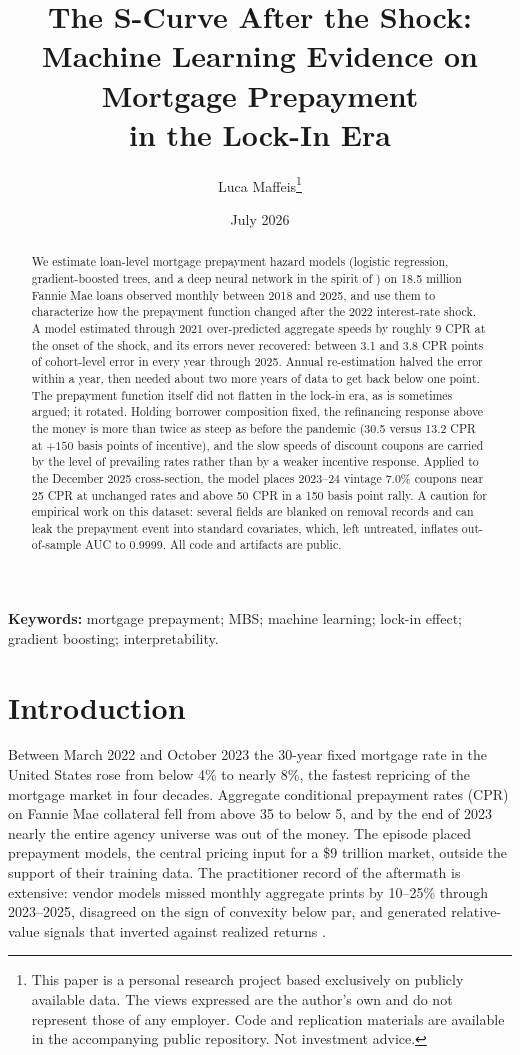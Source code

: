 \documentclass[11pt]{article}
\title{\textbf{The S-Curve After the Shock:\\ Machine Learning Evidence on Mortgage Prepayment\\ in the Lock-In Era}}
\author{Luca Maffeis\thanks{This paper is a personal research project based exclusively on publicly
available data. The views expressed are the author's own and do not represent those of any employer.
Code and replication materials are available in the accompanying public repository. Not investment advice.}}
\date{July 2026}
\begin{document}
\maketitle

\begin{abstract}
\noindent
We estimate loan-level mortgage prepayment hazard models (logistic regression, gradient-boosted
trees, and a deep neural network in the spirit of \citet{sadhwani2021deep}) on 18.5 million Fannie
Mae loans observed monthly between 2018 and 2025, and use them to characterize how the prepayment
function changed after the 2022 interest-rate shock. A model estimated through 2021
over-predicted aggregate speeds by roughly 9 CPR at the onset of the shock, and its errors never
recovered: between 3.1 and 3.8 CPR points of cohort-level error in every year through 2025.
Annual re-estimation halved the error within a year, then needed about two more years of data to
get back below one point. The prepayment function itself did not flatten in the lock-in era, as
is sometimes argued; it rotated. Holding borrower composition fixed, the refinancing response
above the money is more than twice as steep as before the pandemic (30.5 versus 13.2 CPR at
$+150$ basis points of incentive), and the slow speeds of discount coupons are carried by the
level of prevailing rates rather than by a weaker incentive response. Applied to the December
2025 cross-section, the model places 2023--24 vintage 7.0\% coupons near 25 CPR at unchanged
rates and above 50 CPR in a 150 basis point rally. A caution for empirical work on this dataset:
several fields are blanked on removal records and can leak the prepayment event into standard
covariates, which, left untreated, inflates out-of-sample AUC to 0.9999. All code and artifacts are
public.
\end{abstract}

\vspace{0.5em}
\noindent\textbf{Keywords:} mortgage prepayment; MBS; machine learning; lock-in effect;
gradient boosting; interpretability.

\section{Introduction}
\label{sec:intro}

Between March 2022 and October 2023 the 30-year fixed mortgage rate in the United States rose from
below 4\% to nearly 8\%, the fastest repricing of the mortgage market in four decades. Aggregate
conditional prepayment rates (CPR) on Fannie Mae collateral fell from above 35 to below 5, and by
the end of 2023 nearly the entire agency universe was out of the money. The episode placed
prepayment models, the central pricing input for a \$9 trillion market, outside the support of
their training data. The practitioner record of the aftermath is extensive: vendor models missed
monthly aggregate prints by 10--25\% through 2023--2025, disagreed on the sign of convexity below
par, and generated relative-value signals that inverted against realized returns
\citep{yu2023uncharted, katz2024models}.
\end{document}
